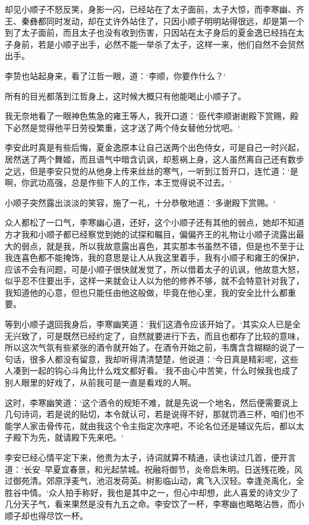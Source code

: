 却见小顺子不怒反笑，身影一闪，已经站在了太子面前，太子大惊，而李寒幽、齐王、秦彝都同时发动，却在丈许外站住了，只因小顺子明明站得很远，却是第一个到了太子面前，而且太子也没有收到伤害，只因站在太子身后的夏金逸已经挡在太子身前，若是小顺子出手，必然不能一举杀了太子，这样一来，他们自然不会贸然出手。

李贽也站起身来，看了江哲一眼，道：‘李顺，你要作什么？‘

所有的目光都落到江哲身上，这时候大概只有他能喝止小顺子了。

我无奈地看了一眼神色焦急的雍王等人，我开口道：‘臣代李顺谢谢殿下赏赐，殿下必然是觉得他平日劳役繁重，这才送了两个侍女替他分忧吧。‘

李安此时真是有些后悔，夏金逸原本让自己送两个出色侍女，可是自己一时兴起，居然送了两个舞姬，而且语气中暗含讥讽，却惹祸上身，这人虽然离自己还有数步之远，但是李安只觉的从他身上传来丝丝的寒气，一听到江哲开口，连忙道：‘是啊，你武功高强，总是作些下人的工作，本王觉得说不过去。‘

小顺子突然露出淡淡的笑容，施了一礼，十分恭敬地道：‘多谢殿下赏赐。‘

众人都松了一口气，李寒幽心道，还好，这个小顺子还有其他的弱点，她却不知道方才我和小顺子都已经察觉到她的试探和瞩目，偏偏齐王的礼物让小顺子流露出最大的弱点，就是我，所以我故意露出喜色，其实那本书虽然不错，但是也不至于让我连喜色都不能掩饰，我的意思是让人从我这里着手，我有小顺子和雍王的保护，应该不会有问题，可是小顺子很快就发觉了，所以借着太子的讥讽，他故意大怒，似乎忍不住要出手，这样一来就会让人以为他的修养不够，就不会特意针对我了，我知道他的心意，但也只能任由他这般做，毕竟在他心里，我的安全比什么都重要。

等到小顺子退回我身后，李寒幽笑道：‘我们这酒令应该开始了。‘其实众人已是全无兴致了，可是既然已经约定了，自然就要进行下去，而且也都存了比较的意味，所以这次气氛有些紧张的酒令就开始了。在酒令开始之前，韦膺含含糊糊的说了一句话，很多人都没有留意，我却听得清清楚楚，他说道：‘今日真是精彩呢，这些人凑到一起的钩心斗角比什么戏文都好看。‘我不由心中苦笑，什么时候我也成了别人眼里的好戏了，从前我可是一直是看戏的人啊。

这时，李寒幽笑道：‘这个酒令的规矩不难，就是先说一个地名，然后便需要说上几句诗词，若是说的贴切，本令就认可，若是说得不好，那就罚酒三杯，咱们也不能学人家击骨传花，就由我这个令主指定次序吧，不论名位还是辅议先后，都以太子殿下为先，就请殿下先来吧。‘

李安已经心情平定下来，他贵为太子，诗词就算不精通，读也读过几首，便开言道：‘长安--早夏宜春景，和光起禁城。祝融将御节，炎帝启朱明。日送残花晚，风过御苑清。郊原浮麦气，池沼发荷英。树影临山动，禽飞入汉轻。幸逢尧禹化，全胜谷中情。‘众人拍手称好，我也是其中之一，但心中却想，此人喜爱的诗文少了几分天子气，看来果然是没有九五之命。李安饮了一杯，李寒幽也略略沾唇，而小顺子却也得尽饮一杯。


